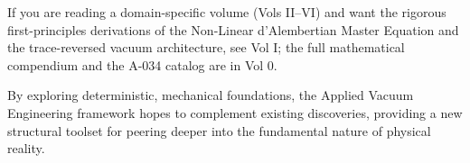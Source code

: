 \noindent If you are reading a domain-specific volume (Vols II--VI) and want the rigorous first-principles derivations of the Non-Linear d'Alembertian Master Equation and the trace-reversed vacuum architecture, see Vol I; the full mathematical compendium and the A-034 catalog are in Vol 0.

\vspace{1.5em}
\noindent By exploring deterministic, mechanical foundations, the Applied Vacuum Engineering framework hopes to complement existing discoveries, providing a new structural toolset for peering deeper into the fundamental nature of physical reality.
%
%
